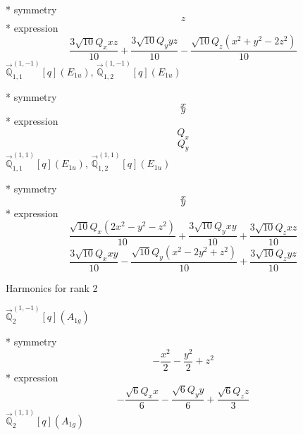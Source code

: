 \documentclass[fleqn,8pt]{jsarticle}
\begin{document}
\noindent\quad ** symmetry
\begin{dmath*}
z
\end{dmath*}
\noindent\quad ** expression
\begin{dmath*}
\frac{3 \sqrt{10} Q_{x} x z}{10} + \frac{3 \sqrt{10} Q_{y} y z}{10} - \frac{\sqrt{10} Q_{z} \left(x^{2} + y^{2} - 2 z^{2}\right)}{10}
\end{dmath*}
\noindent\quad $\vec{\mathbb{Q}}_{1,1}^{(1,-1)}[q](E_{1u})$, $\vec{\mathbb{Q}}_{1,2}^{(1,-1)}[q](E_{1u})$

\noindent\quad ** symmetry
\begin{dmath*}
x
\end{dmath*}
\begin{dmath*}
y
\end{dmath*}
\noindent\quad ** expression
\begin{dmath*}
Q_{x}
\end{dmath*}
\begin{dmath*}
Q_{y}
\end{dmath*}
\noindent\quad $\vec{\mathbb{Q}}_{1,1}^{(1,1)}[q](E_{1u})$, $\vec{\mathbb{Q}}_{1,2}^{(1,1)}[q](E_{1u})$

\noindent\quad ** symmetry
\begin{dmath*}
x
\end{dmath*}
\begin{dmath*}
y
\end{dmath*}
\noindent\quad ** expression
\begin{dmath*}
\frac{\sqrt{10} Q_{x} \left(2 x^{2} - y^{2} - z^{2}\right)}{10} + \frac{3 \sqrt{10} Q_{y} x y}{10} + \frac{3 \sqrt{10} Q_{z} x z}{10}
\end{dmath*}
\begin{dmath*}
\frac{3 \sqrt{10} Q_{x} x y}{10} - \frac{\sqrt{10} Q_{y} \left(x^{2} - 2 y^{2} + z^{2}\right)}{10} + \frac{3 \sqrt{10} Q_{z} y z}{10}
\end{dmath*}

\noindent * Harmonics for rank 2

\noindent\quad $\vec{\mathbb{Q}}_{2}^{(1,-1)}[q](A_{1g})$

\noindent\quad ** symmetry
\begin{dmath*}
- \frac{x^{2}}{2} - \frac{y^{2}}{2} + z^{2}
\end{dmath*}
\noindent\quad ** expression
\begin{dmath*}
- \frac{\sqrt{6} Q_{x} x}{6} - \frac{\sqrt{6} Q_{y} y}{6} + \frac{\sqrt{6} Q_{z} z}{3}
\end{dmath*}
\noindent\quad $\vec{\mathbb{Q}}_{2}^{(1,1)}[q](A_{1g})$
\end{document}
